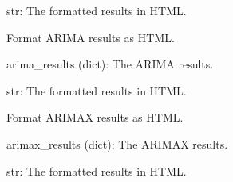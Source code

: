 \documentclass[letterpaper,10pt,english]{sphinxmanual}
\begin{document}
\begin{fulllineitems}
\begin{fulllineitems}
\begin{description}
\sphinxAtStartPar
str: The formatted results in HTML.

\end{description}

\end{fulllineitems}


\begin{fulllineitems}
\label{\detokenize{Mainwindow:Mainwindow.MainWindow.format_arima_results}}
\pysigstartsignatures
{}
\pysigstopsignatures
\sphinxAtStartPar
Format ARIMA results as HTML.
\begin{description}
\sphinxAtStartPar
arima\_results (dict): The ARIMA results.

\sphinxAtStartPar
str: The formatted results in HTML.

\end{description}

\end{fulllineitems}


\begin{fulllineitems}
\label{\detokenize{Mainwindow:Mainwindow.MainWindow.format_arimax_results}}
\pysigstartsignatures
{}
\pysigstopsignatures
\sphinxAtStartPar
Format ARIMAX results as HTML.
\begin{description}
\sphinxAtStartPar
arimax\_results (dict): The ARIMAX results.

\sphinxAtStartPar
str: The formatted results in HTML.

\end{description}

\end{fulllineitems}



\end{fulllineitems}
\end{document}
